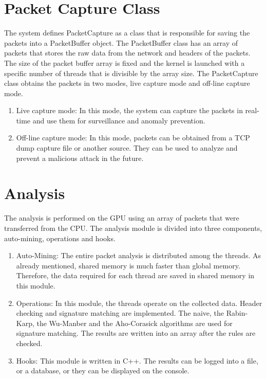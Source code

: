 \section{Packet Capture Class}
The system defines PacketCapture as a class that is responsible for saving the packets into a PacketBuffer object. The PacketBuffer class has an array of packets that stores the raw data from the network and headers of the packets. The size of the packet buffer array is fixed and the kernel is launched with a specific number of threads that is divisible by the array size.
The PacketCapture class obtains the packets in two modes, live capture mode and off-line capture mode. 

\begin{enumerate}[leftmargin=*]
	\item Live capture mode: In this mode, the system can capture the packets in real-time and use them for surveillance and anomaly prevention.
	\item Off-line capture mode: In this mode, packets can be obtained from a TCP dump capture file or another source. They can be used to analyze and prevent a malicious attack in the future.
\end{enumerate}
\vspace{\topsep}

\section{Analysis}
The analysis is performed on the GPU using an array of packets that were transferred from the CPU. The analysis module is divided into three components, auto-mining, operations and hooks.
\begin{enumerate}[leftmargin=*]
	\item Auto-Mining: The entire packet analysis is distributed among the threads. As already mentioned, shared memory is much faster than global memory. Therefore, the data required for each thread are saved in shared memory in this module.
	\item Operations: In this module, the threads operate on the collected data. Header checking and signature matching are implemented. The naive, the Rabin-Karp, the Wu-Manber and the Aho-Corasick algorithms are used for signature matching. The results are written into an array after the rules are checked.
	\item Hooks: This module is written in C++. The results can be logged into a file, or a database, or they can be displayed on the console.
\end{enumerate}